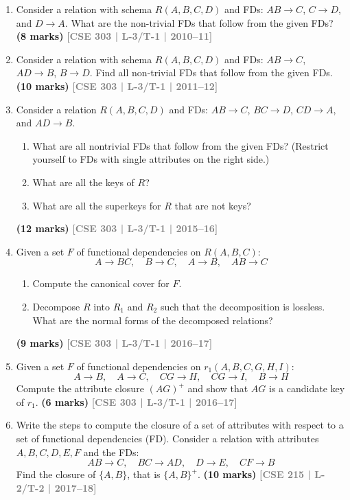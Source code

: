 \documentclass[12pt,a3paper]{article}
\newcommand{\yr}[1]{\hfill\textcolor{gray}{\small\textbf{[#1]}}}
\newcommand{\mk}[1]{\textcolor{orange!70!black}{\small\textbf{(#1 marks)}}}
\begin{document}
\begin{enumerate}

\item Consider a relation with schema $R(A, B, C, D)$ and FDs: $AB \to C$, $C \to D$, and $D \to A$. What are the non-trivial FDs that follow from the given FDs?
\mk{8} \yr{CSE 303 | L-3/T-1 | 2010--11}

\item Consider a relation with schema $R(A, B, C, D)$ and FDs: $AB \to C$, $AD \to B$, $B \to D$. Find all non-trivial FDs that follow from the given FDs.
\mk{10} \yr{CSE 303 | L-3/T-1 | 2011--12}

\item Consider a relation $R(A, B, C, D)$ and FDs: $AB \to C$, $BC \to D$, $CD \to A$, and $AD \to B$.
\begin{enumerate}
  \item What are all nontrivial FDs that follow from the given FDs? (Restrict yourself to FDs with single attributes on the right side.)
  \item What are all the keys of $R$?
  \item What are all the superkeys for $R$ that are not keys?
\end{enumerate}
\mk{12} \yr{CSE 303 | L-3/T-1 | 2015--16}

\item Given a set $F$ of functional dependencies on $R(A, B, C)$:
\[A \to BC,\quad B \to C,\quad A \to B,\quad AB \to C\]
\begin{enumerate}
  \item Compute the canonical cover for $F$.
  \item Decompose $R$ into $R_1$ and $R_2$ such that the decomposition is lossless. What are the normal forms of the decomposed relations?
\end{enumerate}
\mk{9} \yr{CSE 303 | L-3/T-1 | 2016--17}

\item Given a set $F$ of functional dependencies on $r_1(A, B, C, G, H, I)$:
\[A \to B,\quad A \to C,\quad CG \to H,\quad CG \to I,\quad B \to H\]
Compute the attribute closure $(AG)^+$ and show that $AG$ is a candidate key of $r_1$.
\mk{6} \yr{CSE 303 | L-3/T-1 | 2016--17}

\item Write the steps to compute the closure of a set of attributes with respect to a set of functional dependencies (FD). Consider a relation with attributes $A, B, C, D, E, F$ and the FDs:
\[AB \to C,\quad BC \to AD,\quad D \to E,\quad CF \to B\]
Find the closure of $\{A, B\}$, that is $\{A,B\}^+$.
\mk{10} \yr{CSE 215 | L-2/T-2 | 2017--18}


\end{enumerate}
\end{document}
